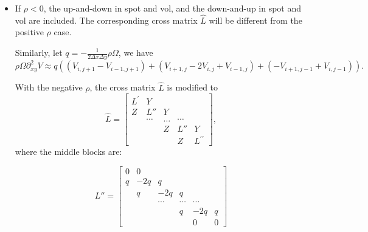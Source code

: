\documentclass[12pt]{article}
\begin{document}
\begin{itemize}
    \item If $\rho < 0$, the up-and-down in spot and vol, and the down-and-up in spot and vol are included. The corresponding cross matrix $\hat{L}$ will be different from the positive $\rho$ case.
    \begin{center}
    \end{center}        
    Similarly, let $q = -\frac{1}{2 \Delta x \Delta y} \rho \Omega$, we have
    \begin{equation}
        \rho \Omega \partial^2_{xy} V \approx q \left( (V_{i, j+1} - V_{i-1, j+1}) + (V_{i+1, j} - 2V_{i, j} + V_{i-1, j}) + (-V_{i+1, j-1} + V_{i, j-1}) \right).
    \end{equation}
    
    With the negative $\rho$, the cross matrix $\hat{L}$ is modified to
    \begin{equation}\label{eq: modified L_hat}
        \hat{L} = \left[\begin{array}{ccccc}L^{\prime} & Y & & & \\ Z & L'' & Y & & \\ & \cdots & \ldots & \cdots & \\ & & Z & L'' & Y \\ & & & Z & L^{\prime\prime} \end{array}\right],
    \end{equation}
    where the middle blocks are:
    
    \[
    L'' = \left[\begin{array}{cccccc}
    0 & 0 & & & & \\
    q & -2q & q & & & \\
    & q & -2q & q & & \\
    & & \cdots & \cdots & \cdots & \\
    & & & q & -2q & q \\
    & & & & 0 & 0
    \end{array}\right]
    \]
    

\end{itemize}
\end{document}

